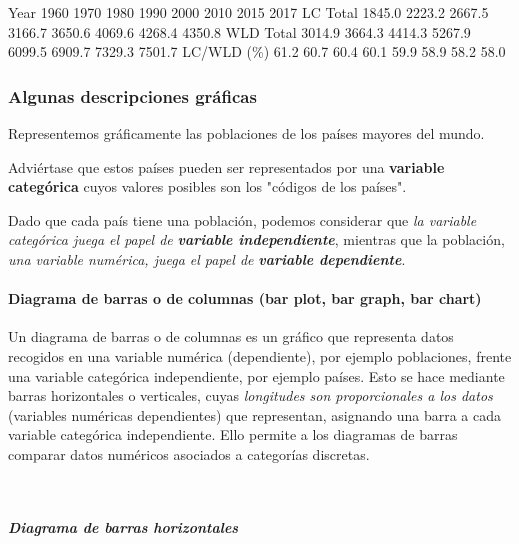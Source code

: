 \documentclass[11pt]{article}
\begin{document}
Year         1960   1970   1980   1990   2000   2010   2015   2017
LC Total   1845.0 2223.2 2667.5 3166.7 3650.6 4069.6 4268.4 4350.8
WLD Total  3014.9 3664.3 4414.3 5267.9 6099.5 6909.7 7329.3 7501.7
LC/WLD (\%)   61.2   60.7   60.4   60.1   59.9   58.9   58.2   58.0
            
    \subsubsection*{Algunas descripciones
gráficas}\label{algunas-descripciones-gruxe1ficas}

Representemos gráficamente las poblaciones de los países mayores del
mundo.

Adviértase que estos países pueden ser representados por una
\textbf{variable categórica} cuyos valores posibles son los "códigos de
los países".

Dado que cada país tiene una población, podemos considerar que \emph{la
variable categórica juega el papel de} \textbf{\emph{variable
independiente}}, mientras que la población, \emph{una variable numérica,
juega el papel de} \textbf{\emph{variable dependiente}}.

    \paragraph{Diagrama de barras o de columnas (bar plot, bar graph, bar
chart)}\label{diagrama-de-barras-o-de-columnas-bar-plot-bar-graph-bar-chart}

Un diagrama de barras o de columnas es un gráfico que representa datos
recogidos en una variable numérica (dependiente), por ejemplo
poblaciones, frente una variable categórica independiente, por ejemplo
países. Esto se hace mediante barras horizontales o verticales, cuyas
\emph{longitudes son proporcionales a los datos} (variables numéricas
dependientes) que representan, asignando una barra a cada variable
categórica independiente. Ello permite a los diagramas de barras
comparar datos numéricos asociados a categorías discretas.

    \begin{center}
    \end{center}
    { \hspace*{\fill} \\}
    
    \subparagraph{Diagrama de barras
horizontales}\label{diagrama-de-barras-horizontales}
\end{document}

